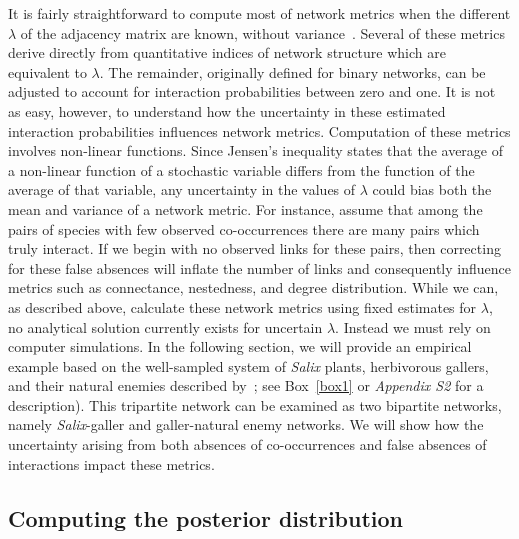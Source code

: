 \documentclass[12pt]{article}
\begin{document}
\begin{spacing}{2.0}
    It is fairly straightforward to compute most of network metrics when the different $\lambda$ of the adjacency matrix are known, without variance~\citep{Poisot2016}. Several of these metrics derive directly from quantitative indices of network structure which are equivalent to $\lambda$. The remainder, originally defined for binary networks, can be adjusted to account for interaction probabilities between zero and one. It is not as easy, however, to understand how the uncertainty in these estimated interaction probabilities influences network metrics. Computation of these metrics involves non-linear functions. Since Jensen's inequality states that the average of a non-linear function of a stochastic variable differs from the function of the average of that variable, any uncertainty in the values of $\lambda$ could bias both the mean and variance of a network metric. For instance, assume that among the pairs of species with few observed co-occurrences there are many pairs which truly interact. If we begin with no observed links for these pairs, then correcting for these false absences will inflate the number of links and consequently influence metrics such as connectance, nestedness, and degree distribution. While we can, as described above, calculate these network metrics using fixed estimates for $\lambda$, no analytical solution currently exists for uncertain $\lambda$. Instead we must rely on computer simulations. In the following section, we will provide an empirical example based on the well-sampled system of \emph{Salix}  plants, herbivorous gallers, and their natural enemies described by~\citet{Kopelke2017}; see Box~\ref{box1} or \emph{Appendix S2} for a description). This tripartite network can be examined as two bipartite networks, namely \emph{Salix}-galler and galler-natural enemy networks. We will show how the uncertainty arising from both absences of co-occurrences and false absences of interactions impact these metrics. %



  \subsection*{Computing the posterior distribution}


\end{spacing}
\end{document}
